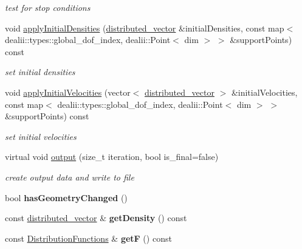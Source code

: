\begin{DoxyCompactItemize}
\begin{DoxyCompactList}\small\item\em test for stop conditions \item\end{DoxyCompactList}\item 
void \hyperlink{classnatrium_1_1CFDSolver_a36146c0f8a6c5abd0ebec4c49f2a4e6d}{applyInitialDensities} (\hyperlink{namespacenatrium_a903d2b92917f582f2ff05f52160ab811}{distributed\_\-vector} \&initialDensities, const map$<$ dealii::types::global\_\-dof\_\-index, dealii::Point$<$ dim $>$ $>$ \&supportPoints) const 
\begin{DoxyCompactList}\small\item\em set initial densities \item\end{DoxyCompactList}\item 
void \hyperlink{classnatrium_1_1CFDSolver_afd82bfa5e1e613ef99b9b870cb73db0e}{applyInitialVelocities} (vector$<$ \hyperlink{namespacenatrium_a903d2b92917f582f2ff05f52160ab811}{distributed\_\-vector} $>$ \&initialVelocities, const map$<$ dealii::types::global\_\-dof\_\-index, dealii::Point$<$ dim $>$ $>$ \&supportPoints) const 
\begin{DoxyCompactList}\small\item\em set initial velocities \item\end{DoxyCompactList}\item 
virtual void \hyperlink{classnatrium_1_1CFDSolver_abd1bdd31bac002516e4184f50bf8a547}{output} (size\_\-t iteration, bool is\_\-final=false)
\begin{DoxyCompactList}\small\item\em create output data and write to file \item\end{DoxyCompactList}\item 
\hypertarget{classnatrium_1_1CFDSolver_a9c3f844b4c6b670aac83bc3ad5519fad}{
bool {\bfseries hasGeometryChanged} ()}
\label{classnatrium_1_1CFDSolver_a9c3f844b4c6b670aac83bc3ad5519fad}

\item 
\hypertarget{classnatrium_1_1CFDSolver_adf0b4e4da292bcb195d926d3174ba2a9}{
const \hyperlink{namespacenatrium_a903d2b92917f582f2ff05f52160ab811}{distributed\_\-vector} \& {\bfseries getDensity} () const }
\label{classnatrium_1_1CFDSolver_adf0b4e4da292bcb195d926d3174ba2a9}

\item 
\hypertarget{classnatrium_1_1CFDSolver_a963e069873d88d130b0fe3f7f77c3d83}{
const \hyperlink{classnatrium_1_1DistributionFunctions}{DistributionFunctions} \& {\bfseries getF} () const }
\label{classnatrium_1_1CFDSolver_a963e069873d88d130b0fe3f7f77c3d83}


\end{DoxyCompactItemize}
